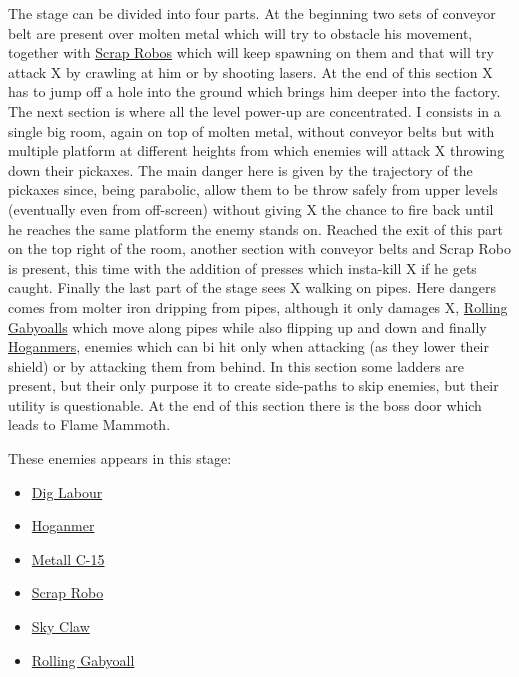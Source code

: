 The stage can be divided into four parts. At the beginning two sets of conveyor belt are present over molten metal which will try to obstacle his movement, together with  \hyperlink{enem:Scrap_Robo}{Scrap Robos} which will keep spawning on them and that will try attack X by crawling at him or by shooting lasers. At the end of this section X has to jump off a hole into the ground which brings him deeper into the factory. The next section is where all the level power-up are concentrated. I consists in a single big room, again on top of molten metal, without conveyor belts but with multiple platform at different heights from which enemies will attack X throwing down their pickaxes. The main danger here is given by the trajectory of the pickaxes since, being parabolic, allow them to be throw safely from upper levels (eventually even from off-screen) without giving X the chance to fire back until he reaches the same platform the enemy stands on. Reached the exit of this part on the top right of the room, another section with conveyor belts and Scrap Robo is present, this time with the addition of presses which insta-kill X if he gets caught. Finally the last part of the stage sees X walking on pipes. Here dangers comes from molter iron dripping from pipes, although it only damages X,  \hyperlink{enem:Rolling_Gabyoall}{Rolling Gabyoalls} which move along pipes while also flipping up and down and finally \hyperlink{enem:Hoganmer}{Hoganmers}, enemies which can bi hit only when attacking (as they lower their shield) or by attacking them from behind. In this section some ladders are present, but their only purpose it to create side-paths to skip enemies, but their utility is questionable. At the end of this section there is the boss door which leads to Flame Mammoth.

These enemies appears in this stage\cite{wiki:Factory}:
\begin{itemize}
	\item \hyperlink{enem:Dig_Labour}{Dig Labour} 
	\item \hyperlink{enem:Hoganmer}{Hoganmer}
	\item \hyperlink{enem:Metall_C-15}{Metall C-15}
	\item \hyperlink{enem:Scrap_Robo}{Scrap Robo}
	\item \hyperlink{enem:Sky_Claw}{Sky Claw}
	\item \hyperlink{enem:Rolling_Gabyoall}{Rolling Gabyoall}
\end{itemize}

